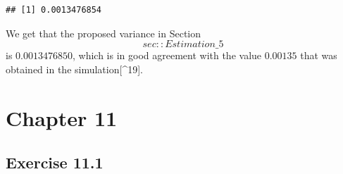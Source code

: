 \documentclass[]{krantz}
\makeatletter
\newenvironment{Shaded}{\begin{snugshade}}{\end{snugshade}}
\newcommand{\KeywordTok}[1]{\textcolor[rgb]{0.13,0.29,0.53}{\textbf{#1}}}
\newcommand{\DecValTok}[1]{\textcolor[rgb]{0.00,0.00,0.81}{#1}}
\newcommand{\StringTok}[1]{\textcolor[rgb]{0.31,0.60,0.02}{#1}}
\newcommand{\OperatorTok}[1]{\textcolor[rgb]{0.81,0.36,0.00}{\textbf{#1}}}
\newcommand{\NormalTok}[1]{#1}
\newenvironment{kframe}{%
\medskip{}
\setlength{\fboxsep}{.8em}
 \def\at@end@of@kframe{}%
 \ifinner\ifhmode%
  \def\at@end@of@kframe{\end{minipage}}%
  \begin{minipage}{\columnwidth}%
 \fi\fi%
 \def\FrameCommand##1{\hskip\@totalleftmargin \hskip-\fboxsep
 \colorbox{shadecolor}{##1}\hskip-\fboxsep
     \hskip-\linewidth \hskip-\@totalleftmargin \hskip\columnwidth}%
 \MakeFramed {\advance\hsize-\width
   \@totalleftmargin\z@ \linewidth\hsize
   \@setminipage}}%
 {\par\unskip\endMakeFramed%
 \at@end@of@kframe}
\renewenvironment{Shaded}{\begin{kframe}}{\end{kframe}}
\theoremstyle{definition}
\theoremstyle{definition}
\theoremstyle{definition}
\theoremstyle{remark}
\makeatother
\begin{document}
\begin{enumerate}
\begin{Shaded}
\end{Shaded}

\begin{verbatim}
## [1] 0.0013476854
\end{verbatim}

  We get that the proposed variance in Section~\[sec::Estimation\_5\] is
  \(0.0013476850\), which is in good agreement with the value
  \(0.00135\) that was obtained in the simulation{[}\^{}19{]}.
\end{enumerate}

\section*{Chapter 11}\label{chapter-11}


\subsection*{Exercise 11.1}\label{exercise-11.1}
\end{document}
